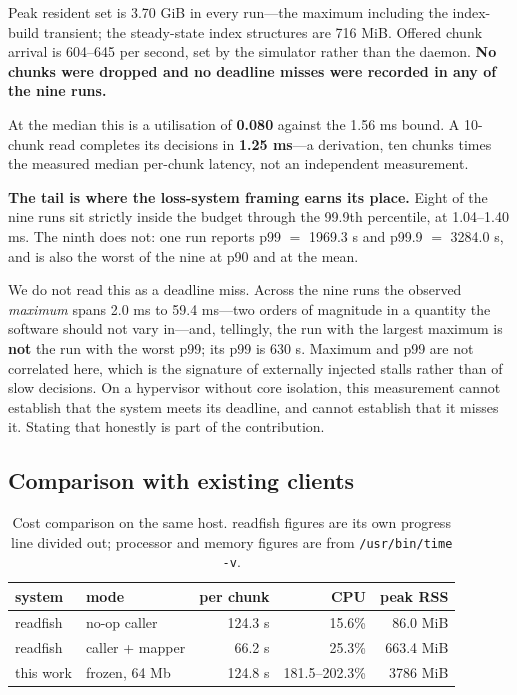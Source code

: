 \documentclass[runningheads]{llncs}
\begin{document}
Peak resident set is 3.70 GiB in every run---the maximum including the index-build transient;
the steady-state index structures are 716 MiB. Offered chunk arrival is 604--645 per second, set
by the simulator rather than the daemon. \textbf{No chunks were dropped and no deadline misses
were recorded in any of the nine runs.}

At the median this is a utilisation of \textbf{0.080} against the 1.56 ms bound. A 10-chunk read
completes its decisions in \textbf{1.25 ms}---a derivation, ten chunks times the measured median
per-chunk latency, not an independent measurement.

\textbf{The tail is where the loss-system framing earns its place.} Eight of the nine runs sit
strictly inside the budget through the 99.9th percentile, at 1.04--1.40 ms. The ninth does not:
one run reports p99 $=$ 1969.3 \textmu{}s and p99.9 $=$ 3284.0 \textmu{}s, and is also the worst of the nine at
p90 and at the mean.

We do not read this as a deadline miss. Across the nine runs the observed \emph{maximum} spans
2.0 ms to 59.4 ms---two orders of magnitude in a quantity the software should not vary in---and,
tellingly, the run with the largest maximum is \textbf{not} the run with the worst p99; its p99
is 630 \textmu{}s. Maximum and p99 are not correlated here, which is the signature of externally
injected stalls rather than of slow decisions. On a hypervisor without core isolation, this
measurement cannot establish that the system meets its deadline, and cannot establish that it
misses it. Stating that honestly is part of the contribution.

\subsection{Comparison with existing clients}

\begin{table}[t]
\caption{Cost comparison on the same host. readfish figures are its own progress line divided
out; processor and memory figures are from \texttt{/usr/bin/time -v}.}
\label{tab:costs}
\centering
\scriptsize
\begin{tabular}{llrrr}
\toprule
system & mode & per chunk & CPU & peak RSS \\
\midrule
readfish  & no-op caller      & 124.3 \textmu{}s & 15.6\%  & 86.0 MiB \\
readfish  & caller + mapper   & 66.2 \textmu{}s  & 25.3\%  & 663.4 MiB \\
this work & frozen, 64 Mb     & 124.8 \textmu{}s & 181.5--202.3\% & 3786 MiB \\
\bottomrule
\end{tabular}
\end{table}
\end{document}
